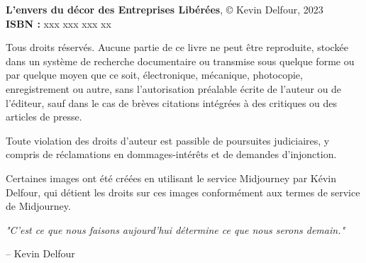 \begin{flushleft}

    \textbf{L'envers du décor des Entreprises Libérées}, © Kevin Delfour, 2023 \\[0.25cm]
    \textbf{ISBN : } xxx xxx xxx xx

    \noindent Tous droits réservés. Aucune partie de ce livre ne peut être reproduite, stockée dans un système de recherche documentaire ou transmise sous quelque forme ou par quelque moyen que ce soit, électronique, mécanique, photocopie, enregistrement ou autre, sans l'autorisation préalable écrite de l'auteur ou de l'éditeur, sauf dans le cas de brèves citations intégrées à des critiques ou des articles de presse.

    Toute violation des droits d'auteur est passible de poursuites judiciaires, y compris de réclamations en dommages-intérêts et de demandes d'injonction.

    Certaines images ont été créées en utilisant le service Midjourney par Kévin Delfour, qui détient les droits sur ces images conformément aux termes de service de Midjourney.

\end{flushleft}

\newpage{}
\thispagestyle {empty}

\vspace*{2cm}

\begin{center}
    \vspace*{\fill}
    \parbox{10cm}{
        \begin{center}
            \large{\selectfont
                \textit{"C'est ce que nous faisons aujourd'hui détermine ce que nous serons demain."}
            }

            \vspace{.5cm}\hfill{-- Kevin Delfour}
        \end{center}
    }
    \vspace*{\fill}
\end{center}

\newpage
\thispagestyle{empty} %
\mbox{}

